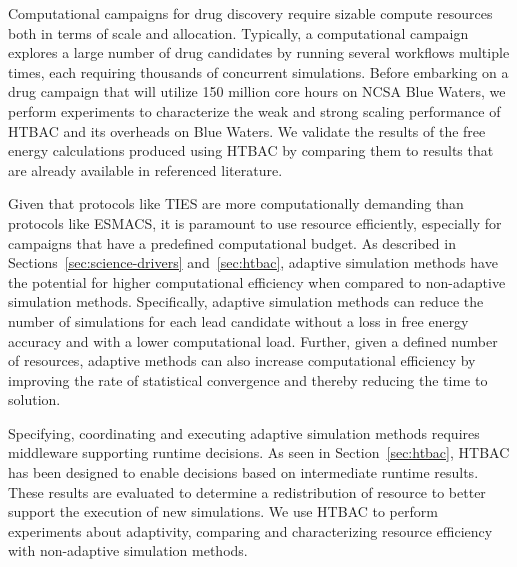 Computational campaigns for drug discovery require sizable compute resources
both in terms of scale and allocation. Typically, a computational campaign
explores a large number of drug candidates by running several workflows
multiple times, each requiring thousands of concurrent simulations. Before
embarking on a drug campaign that will utilize 150 million core hours on NCSA
Blue Waters, we perform experiments to characterize the weak and strong
scaling performance of HTBAC and its overheads on Blue Waters. We validate
the results of the free energy calculations produced using HTBAC by comparing
them to results that are already available in referenced literature.

Given that protocols like TIES are more computationally demanding than
protocols like ESMACS, it is paramount to use resource efficiently,
especially for campaigns that have a predefined computational budget. As
described in Sections~\ref{sec:science-drivers} and~\ref{sec:htbac}, adaptive
simulation methods have the potential for higher computational efficiency
when compared to non-adaptive simulation methods. Specifically, adaptive
simulation methods can reduce the number of simulations for each lead
candidate without a loss in free energy accuracy and with a lower
computational load. Further, given a defined number of resources, adaptive
methods can also increase computational efficiency by improving the rate of
statistical convergence and thereby reducing the time to solution.

Specifying, coordinating and executing adaptive simulation methods requires
middleware supporting runtime decisions. As seen in Section~\ref{sec:htbac},
HTBAC has been designed to enable decisions based on intermediate runtime
results. These results are evaluated to determine a redistribution of
resource to better support the execution of new simulations. We use HTBAC to
perform experiments about adaptivity, comparing and characterizing resource
efficiency with non-adaptive simulation methods.


